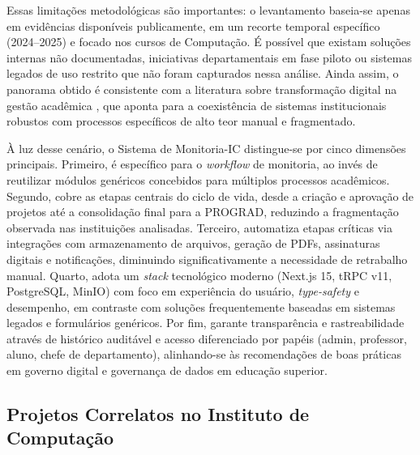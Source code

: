 \documentclass[portuguese]{sbc2025}%
\begin{document}
Essas limitações metodológicas são importantes: o levantamento baseia-se apenas em evidências disponíveis publicamente, em um recorte temporal específico (2024--2025) e focado nos cursos de Computação. É possível que existam soluções internas não documentadas, iniciativas departamentais em fase piloto ou sistemas legados de uso restrito que não foram capturados nessa análise. Ainda assim, o panorama obtido é consistente com a literatura sobre transformação digital na gestão acadêmica \cite{Laudon_Laudon_2011, Davenport1993, Hammer1993, WorldBank2022, UNESCO2023}, que aponta para a coexistência de sistemas institucionais robustos com processos específicos de alto teor manual e fragmentado.

À luz desse cenário, o Sistema de Monitoria-IC distingue-se por cinco dimensões principais. Primeiro, é específico para o \textit{workflow} de monitoria, ao invés de reutilizar módulos genéricos concebidos para múltiplos processos acadêmicos. Segundo, cobre as etapas centrais do ciclo de vida, desde a criação e aprovação de projetos até a consolidação final para a PROGRAD, reduzindo a fragmentação observada nas instituições analisadas. Terceiro, automatiza etapas críticas via integrações com armazenamento de arquivos, geração de PDFs, assinaturas digitais e notificações, diminuindo significativamente a necessidade de retrabalho manual. Quarto, adota um \textit{stack} tecnológico moderno (Next.js 15, tRPC v11, PostgreSQL, MinIO) com foco em experiência do usuário, \textit{type-safety} e desempenho, em contraste com soluções frequentemente baseadas em sistemas legados e formulários genéricos. Por fim, garante transparência e rastreabilidade através de histórico auditável e acesso diferenciado por papéis (admin, professor, aluno, chefe de departamento), alinhando-se às recomendações de boas práticas em governo digital e governança de dados em educação superior.

\subsection{Projetos Correlatos no Instituto de Computação}
\end{document}

